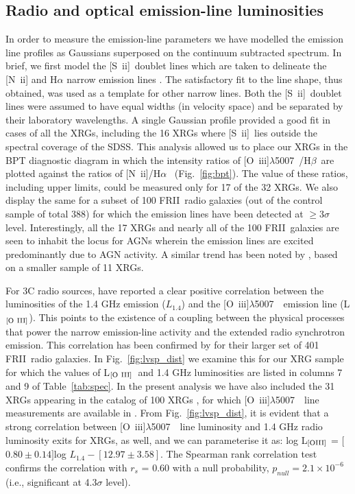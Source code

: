 \documentclass[twocolumn]{aastex62}
\def\loiii{L$_{[\rm O~III]}$}
\def\frii{FR{II}~}
\def\sii{Si~{\sc ii}}
\def\sii{[S~{\sc ii}]}
\def\oiii{[O~{\sc iii}]$\lambda$5007~}
\def\halpha{H$\alpha$~}
\def\hbeta{H$\beta$~}
\begin{document}
\subsection{Radio and optical emission-line luminosities}
\label{subsec:xrgopt}
In order to measure the emission-line parameters we have modelled the
emission line profiles as Gaussians superposed on the continuum
subtracted spectrum. In brief, we first model the \sii\ doublet lines
which are taken to delineate the [N{\sc~ii}] and H$\alpha$ narrow
emission lines \citep{Greene2004ApJ...610..722G}. The satisfactory fit
to the line shape, thus obtained, was used as a template for other
narrow lines. Both the \sii\ doublet lines were assumed to have equal
widths (in velocity space) and be separated by their laboratory
wavelengths. A single Gaussian profile provided a good fit in cases of
all the XRGs, including the 16 XRGs where \sii\ lies outside the
spectral coverage of the SDSS. This analysis allowed us to place our
XRGs in the BPT diagnostic diagram
\citep{Kewley20062006MNRAS.372..961K} in which the intensity ratios of
\oiii/\hbeta are plotted against the ratios of [N{\sc~ii}]/\halpha
(Fig.~\ref{fig:bpt}). The value of these ratios, including upper
limits, could be measured only for 17 of the 32 XRGs. We also display
the same for a subset of 100 \frii radio galaxies (out of the control
sample of total 388) for which the emission lines have been detected
at $\ge 3 \sigma$ level. Interestingly, all the 17 XRGs and nearly all
of the 100 \frii galaxies are seen to inhabit the locus for AGNs
wherein the emission lines are excited predominantly due to AGN
activity. A similar trend has been noted by
\citet{Gillone2016A&A...587A..25G}, based on a smaller sample of 11
XRGs.
  

For 3C radio sources, \citet{Rawlings1989MNRAS.240..701R} have
reported a clear positive correlation between the luminosities of the
1.4 GHz emission ($L_{1.4}$) and the \oiii\ emission line (\loiii).
This points to the existence of a coupling between the physical
processes that power the narrow emission-line activity and the
extended radio synchrotron emission. This correlation has been confirmed
by \citet{Koziel2011MNRAS.415.1013K} for their larger set of 401
\frii radio galaxies. In Fig.~\ref{fig:lvsp_dist} we examine this 
for our XRG sample for which the values of \loiii\ and 1.4 GHz 
luminosities are listed in columns 7 and 9 of Table~\ref{tab:spec}. 
In the present analysis we have also included the 31 XRGs appearing 
in the catalog of 100 XRGs \citep{Cheung2007AJ....133.2097C}, for 
which \oiii\ line measurements are available in \citet{Landt2010MNRAS.408.1103L}. 
From Fig.~\ref{fig:lvsp_dist}, it is evident that a strong correlation
between \oiii\ line luminosity and 1.4 GHz radio luminosity exits for 
XRGs, as well, and we can parameterise it as: log L$_{[\rm OIII]}$ = 
[$0.80 \pm 0.14] $log $L_{1.4} - [12.97 \pm 3.58]$. The Spearman rank 
correlation test confirms the correlation with $r_s$ = 0.60 with a null 
probability, $p_{null} = 2.1 \times10^{-6}$ (i.e., significant at 4.3$\sigma$ level).
\end{document}
